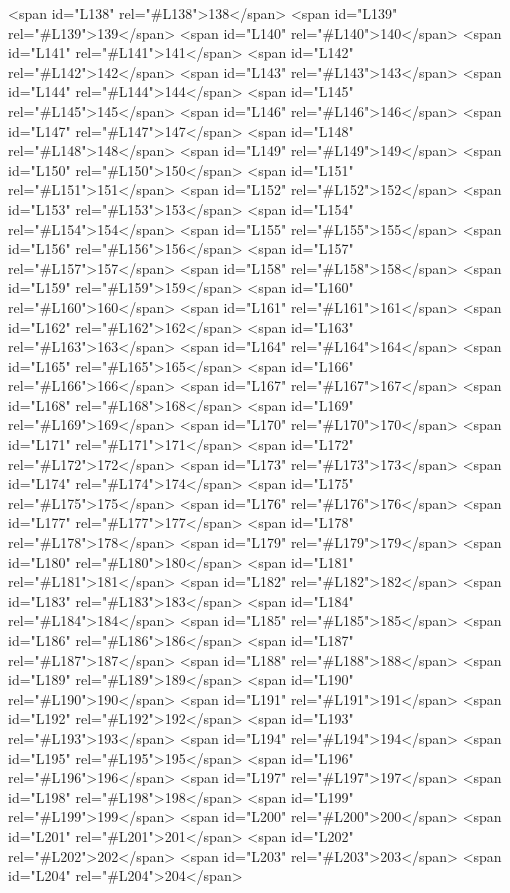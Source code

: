<span id="L138" rel="#L138">138</span>
<span id="L139" rel="#L139">139</span>
<span id="L140" rel="#L140">140</span>
<span id="L141" rel="#L141">141</span>
<span id="L142" rel="#L142">142</span>
<span id="L143" rel="#L143">143</span>
<span id="L144" rel="#L144">144</span>
<span id="L145" rel="#L145">145</span>
<span id="L146" rel="#L146">146</span>
<span id="L147" rel="#L147">147</span>
<span id="L148" rel="#L148">148</span>
<span id="L149" rel="#L149">149</span>
<span id="L150" rel="#L150">150</span>
<span id="L151" rel="#L151">151</span>
<span id="L152" rel="#L152">152</span>
<span id="L153" rel="#L153">153</span>
<span id="L154" rel="#L154">154</span>
<span id="L155" rel="#L155">155</span>
<span id="L156" rel="#L156">156</span>
<span id="L157" rel="#L157">157</span>
<span id="L158" rel="#L158">158</span>
<span id="L159" rel="#L159">159</span>
<span id="L160" rel="#L160">160</span>
<span id="L161" rel="#L161">161</span>
<span id="L162" rel="#L162">162</span>
<span id="L163" rel="#L163">163</span>
<span id="L164" rel="#L164">164</span>
<span id="L165" rel="#L165">165</span>
<span id="L166" rel="#L166">166</span>
<span id="L167" rel="#L167">167</span>
<span id="L168" rel="#L168">168</span>
<span id="L169" rel="#L169">169</span>
<span id="L170" rel="#L170">170</span>
<span id="L171" rel="#L171">171</span>
<span id="L172" rel="#L172">172</span>
<span id="L173" rel="#L173">173</span>
<span id="L174" rel="#L174">174</span>
<span id="L175" rel="#L175">175</span>
<span id="L176" rel="#L176">176</span>
<span id="L177" rel="#L177">177</span>
<span id="L178" rel="#L178">178</span>
<span id="L179" rel="#L179">179</span>
<span id="L180" rel="#L180">180</span>
<span id="L181" rel="#L181">181</span>
<span id="L182" rel="#L182">182</span>
<span id="L183" rel="#L183">183</span>
<span id="L184" rel="#L184">184</span>
<span id="L185" rel="#L185">185</span>
<span id="L186" rel="#L186">186</span>
<span id="L187" rel="#L187">187</span>
<span id="L188" rel="#L188">188</span>
<span id="L189" rel="#L189">189</span>
<span id="L190" rel="#L190">190</span>
<span id="L191" rel="#L191">191</span>
<span id="L192" rel="#L192">192</span>
<span id="L193" rel="#L193">193</span>
<span id="L194" rel="#L194">194</span>
<span id="L195" rel="#L195">195</span>
<span id="L196" rel="#L196">196</span>
<span id="L197" rel="#L197">197</span>
<span id="L198" rel="#L198">198</span>
<span id="L199" rel="#L199">199</span>
<span id="L200" rel="#L200">200</span>
<span id="L201" rel="#L201">201</span>
<span id="L202" rel="#L202">202</span>
<span id="L203" rel="#L203">203</span>
<span id="L204" rel="#L204">204</span>
